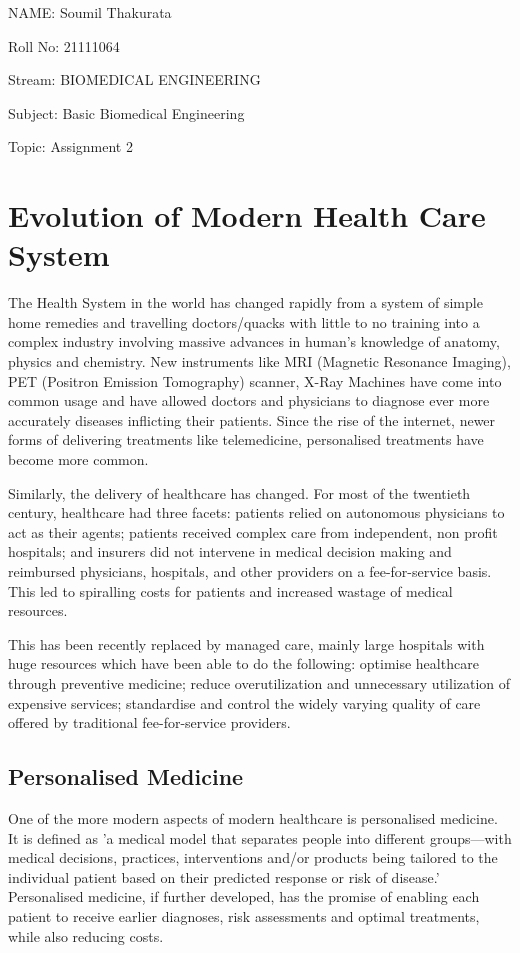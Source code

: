 \documentclass[11pt]{article}
\begin{document}
NAME: Soumil Thakurata

Roll No: 21111064

Stream: BIOMEDICAL ENGINEERING

Subject: Basic Biomedical Engineering

Topic: Assignment 2

\pagebreak

\section*{Evolution of Modern Health Care System}

The Health System in the world has changed rapidly from a system of simple home remedies and travelling doctors/quacks with little to no training into a complex industry involving massive advances in human's knowledge of anatomy, physics and chemistry. New instruments like MRI (Magnetic Resonance Imaging), PET (Positron Emission Tomography) scanner, X-Ray Machines have come into common usage and have allowed doctors and physicians to diagnose ever more accurately diseases inflicting their patients. Since the rise of the internet, newer forms of delivering treatments like telemedicine, personalised treatments have become more common.

Similarly, the delivery of healthcare has changed. For most of the twentieth century, healthcare had three facets: patients relied on autonomous physicians to act as their agents; patients received complex care from independent, non profit hospitals; and
insurers did not intervene in medical decision making and reimbursed physicians, hospitals, and other providers on a fee-for-service basis. This led to spiralling costs for patients and increased wastage of medical resources.  

This has been recently replaced by managed care, mainly large hospitals with huge resources which have been able to do the following: optimise healthcare through preventive medicine; reduce overutilization and unnecessary utilization of expensive services; standardise and control the widely varying quality of care offered by traditional fee-for-service providers. 

\subsection*{Personalised Medicine}

One of the more modern aspects of modern healthcare is personalised medicine. It is defined as 'a medical model that separates people into different groups—with medical decisions, practices, interventions and/or products being tailored to the individual patient based on their predicted response or risk of disease.' Personalised medicine, if further developed, has the promise of enabling each patient to receive earlier diagnoses, risk assessments and optimal treatments, while also reducing costs. 
\end{document}
